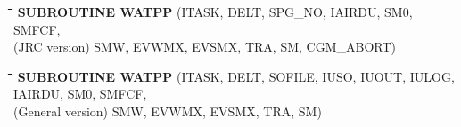\bigskip
\bigskip
\bigskip
\bigskip
\bigskip
\bigskip
\bigskip
\nwln
\begin{tabbing}
\hspace{1.27cm}\=\hspace{1.27cm}\=\hspace{1.27cm}\=\hspace{1.27cm}\=%
\hspace{1.27cm}\=\hspace{1.27cm}\=\hspace{1.27cm}\=\hspace{1.27cm}\=%
\hspace{1.27cm}\=\hspace{1.27cm}\=\kill
 {\bf SUBROUTINE WATPP}\> \> \> (ITASK, DELT, SPG\_NO, IAIRDU, SM0, SMFCF,\\
(JRC version)\> \> \>  SMW, EVWMX, EVSMX, TRA, SM, CGM\_ABORT)
\end{tabbing}
\nwln
\begin{tabbing}
\hspace{1.27cm}\=\hspace{1.27cm}\=\hspace{1.27cm}\=\hspace{1.27cm}\=%
\hspace{1.27cm}\=\hspace{1.27cm}\=\hspace{1.27cm}\=\hspace{1.27cm}\=%
\hspace{1.27cm}\=\hspace{1.27cm}\=\kill
{\bf SUBROUTINE WATPP}\> \> \> (ITASK, DELT, SOFILE, IUSO, IUOUT, IULOG, IAIRDU, SM0, SMFCF,\\
(General version)\> \> \>  SMW, EVWMX, EVSMX, TRA, SM)
\end{tabbing}
\nwln
